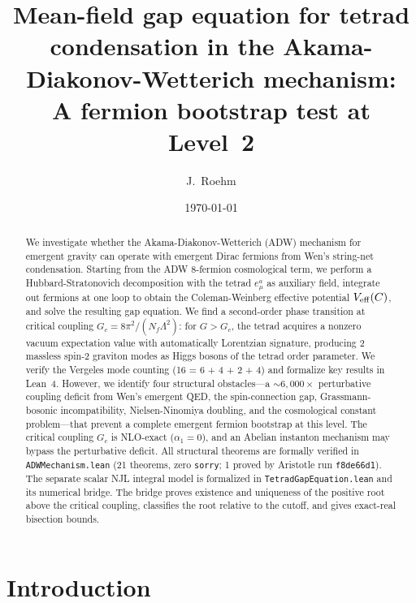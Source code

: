 \documentclass[aps,prd,twocolumn,superscriptaddress,nofootinbib]{revtex4-2}
\begin{document}
\title{Mean-field gap equation for tetrad condensation in the Akama-Diakonov-Wetterich mechanism: \\
A fermion bootstrap test at Level~2}

\author{J.~Roehm}

\date{\today}

\begin{abstract}
We investigate whether the Akama-Diakonov-Wetterich (ADW) mechanism for
emergent gravity can operate with emergent Dirac fermions from Wen's
string-net condensation. Starting from the ADW 8-fermion cosmological
term, we perform a Hubbard-Stratonovich decomposition with the tetrad
$e^a_\mu$ as auxiliary field, integrate out fermions at one loop to
obtain the Coleman-Weinberg effective potential $V_{\rm eff}(C)$, and
solve the resulting gap equation. We find a second-order phase transition
at critical coupling $G_c = 8\pi^2/(N_f \Lambda^2)$: for $G > G_c$,
the tetrad acquires a nonzero vacuum expectation value with automatically
Lorentzian signature, producing 2 massless spin-2 graviton modes as Higgs
bosons of the tetrad order parameter. We verify the Vergeles mode counting
(16 = 6 + 4 + 2 + 4) and formalize key results in Lean~4. However, we
identify four structural obstacles---a ${\sim}6{,}000\times$ perturbative coupling
deficit from Wen's emergent QED, the spin-connection gap, Grassmann-bosonic
incompatibility, Nielsen-Ninomiya doubling, and the cosmological constant
problem---that prevent a complete emergent fermion bootstrap at this level.
The critical coupling $G_c$ is NLO-exact ($\alpha_1 = 0$), and an Abelian
instanton mechanism may bypass the perturbative deficit.
All structural theorems are formally verified in \texttt{ADWMechanism.lean}
(21 theorems, zero \texttt{sorry}; 1 proved by Aristotle run \texttt{f8de66d1}).
The separate scalar NJL integral model is formalized in
\texttt{TetradGapEquation.lean} and its numerical bridge. The bridge proves
existence and uniqueness of the positive root above the critical coupling,
classifies the root relative to the cutoff, and gives exact-real
bisection bounds.
\end{abstract}

\maketitle

\section{Introduction}
\end{document}
